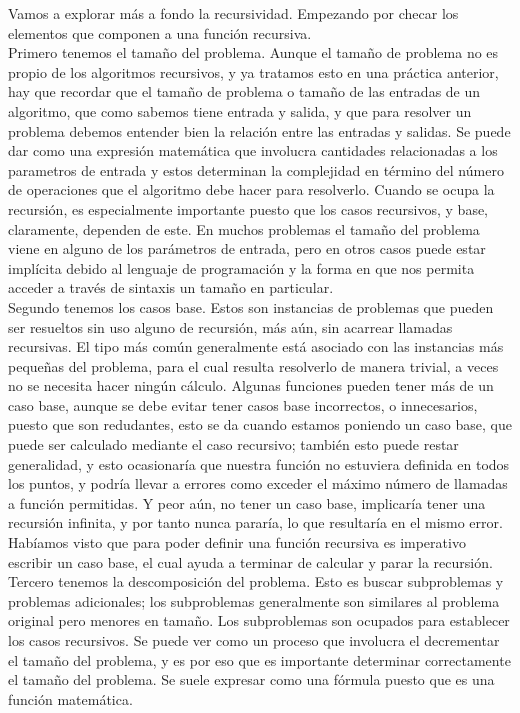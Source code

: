 \documentclass[12pt,twoside]{article}
\begin{document}
Vamos a explorar más a fondo la recursividad. Empezando por checar los elementos que componen a una función recursiva.
\newline
\\ Primero tenemos el tamaño del problema. Aunque el tamaño de problema no es propio de los algoritmos recursivos, y ya tratamos esto en una práctica anterior, hay que recordar que el tamaño de problema o tamaño de las entradas de un algoritmo, que como sabemos tiene entrada y salida, y que para resolver un problema debemos entender bien la relación entre las entradas y salidas. Se puede dar como una expresión matemática que involucra cantidades relacionadas a los parametros de entrada y estos determinan la complejidad en término del número de operaciones que el algoritmo debe hacer para resolverlo. Cuando se ocupa la recursión, es especialmente importante puesto que los casos recursivos, y base, claramente, dependen de este. En muchos problemas el tamaño del problema viene en alguno de los parámetros de entrada, pero en otros casos puede estar implícita debido al lenguaje de programación y la forma en que nos permita acceder a través de sintaxis un tamaño en particular.
\newline
\\ Segundo tenemos los casos base. Estos son instancias de problemas que pueden ser resueltos sin uso alguno de recursión, más aún, sin acarrear llamadas recursivas. El tipo más común generalmente está asociado con las instancias más pequeñas del problema, para el cual resulta resolverlo de manera trivial, a veces no se necesita hacer ningún cálculo. Algunas funciones pueden tener más de un caso base, aunque se debe evitar tener casos base incorrectos, o innecesarios, puesto que son redudantes, esto se da cuando estamos poniendo un caso base, que puede ser calculado mediante el caso recursivo; también esto puede restar generalidad, y esto ocasionaría que nuestra función no estuviera definida en todos los puntos, y podría llevar a errores como exceder el máximo número de llamadas a función permitidas. Y peor aún, no tener un caso base, implicaría tener una recursión infinita, y por tanto nunca pararía, lo que resultaría en el mismo error. Habíamos visto que para poder definir una función recursiva es imperativo escribir un caso base, el cual ayuda a terminar de calcular y parar la recursión.
\newline
\\ Tercero tenemos la descomposición del problema. Esto es buscar subproblemas y problemas adicionales; los subproblemas generalmente son similares al problema original pero menores en tamaño. Los subproblemas son ocupados para establecer los casos recursivos. Se puede ver como un proceso que involucra el decrementar el tamaño del problema, y es por eso que es importante determinar correctamente el tamaño del problema. Se suele expresar como una fórmula puesto que es una función matemática.
\end{document}
